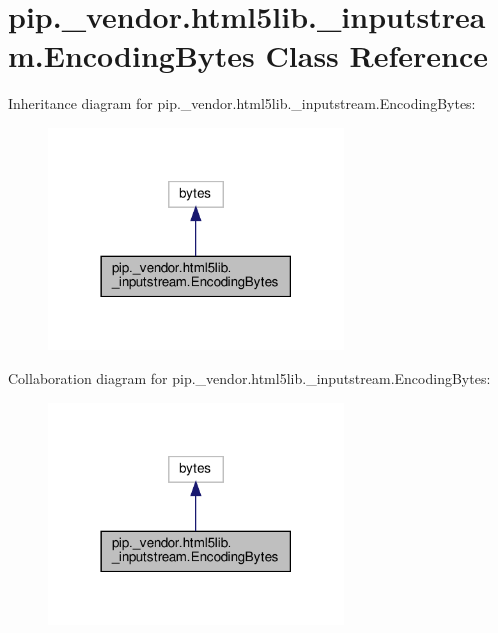 \hypertarget{classpip_1_1__vendor_1_1html5lib_1_1__inputstream_1_1EncodingBytes}{}\section{pip.\+\_\+vendor.\+html5lib.\+\_\+inputstream.\+Encoding\+Bytes Class Reference}
\label{classpip_1_1__vendor_1_1html5lib_1_1__inputstream_1_1EncodingBytes}


Inheritance diagram for pip.\+\_\+vendor.\+html5lib.\+\_\+inputstream.\+Encoding\+Bytes\+:
\nopagebreak
\begin{figure}[H]
\begin{center}
\leavevmode
\includegraphics[width=222pt]{classpip_1_1__vendor_1_1html5lib_1_1__inputstream_1_1EncodingBytes__inherit__graph}
\end{center}
\end{figure}


Collaboration diagram for pip.\+\_\+vendor.\+html5lib.\+\_\+inputstream.\+Encoding\+Bytes\+:
\nopagebreak
\begin{figure}[H]
\begin{center}
\leavevmode
\includegraphics[width=222pt]{classpip_1_1__vendor_1_1html5lib_1_1__inputstream_1_1EncodingBytes__coll__graph}
\end{center}
\end{figure}
